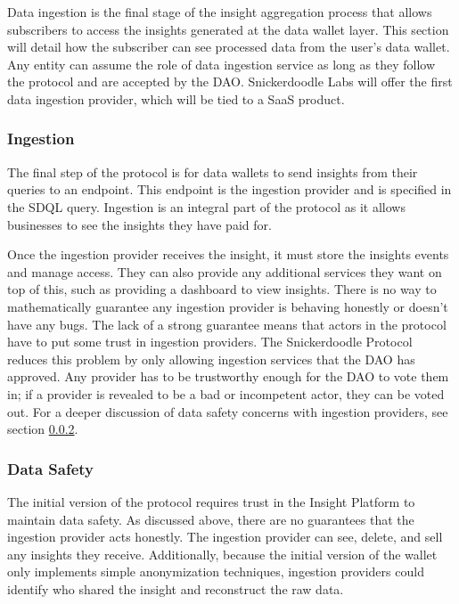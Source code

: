 Data ingestion is the final stage of the insight aggregation process that allows subscribers to access the insights generated at the data wallet layer. 
This section will detail how the subscriber can see processed data from the user's data wallet. Any entity can assume the role of data ingestion service 
as long as they follow the protocol and are accepted by the DAO. Snickerdoodle Labs will offer the first data ingestion provider, which will be tied to 
a SaaS product. 

\subsubsection{Ingestion}
The final step of the protocol is for data wallets to send insights from their queries to an endpoint. This endpoint is the ingestion provider and is 
specified in the SDQL query. Ingestion is an integral part of the protocol as it allows businesses to see the insights they have paid for.

Once the ingestion provider receives the insight, it must store the insights events and manage access. They can also provide any additional services 
they want on top of this, such as providing a dashboard to view insights. There is no way to mathematically guarantee any ingestion provider is behaving 
honestly or doesn't have any bugs. The lack of a strong guarantee means that actors in the protocol have to put some trust in ingestion providers. The 
Snickerdoodle Protocol reduces this problem by only allowing ingestion services that the DAO has approved. Any provider has to be trustworthy enough for 
the DAO to vote them in; if a provider is revealed to be a bad or incompetent actor, they can be voted out. For a deeper discussion of data safety 
concerns with ingestion providers, see section \ref{section:IngestionDataSafety}.

\subsubsection{Data Safety}
\label{section:IngestionDataSafety}

The initial version of the protocol requires trust in the Insight Platform to maintain data safety. As discussed above, there are no guarantees that the 
ingestion provider acts honestly. The ingestion provider can see, delete, and sell any insights they receive. Additionally, because the initial version 
of the wallet only implements simple anonymization techniques, ingestion providers could identify who shared the insight and reconstruct the raw data. 


